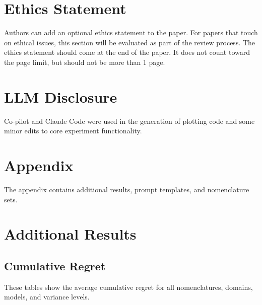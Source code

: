 \documentclass{article} %
\begin{document}
\section*{Ethics Statement}
Authors can add an optional ethics statement to the paper. 
For papers that touch on ethical issues, this section will be evaluated as part of the review process. The ethics statement should come at the end of the paper. It does not count toward the page limit, but should not be more than 1 page. 

\section*{LLM Disclosure}
Co-pilot and Claude Code were used in the generation of plotting code and some minor edits to core experiment functionality. 




\appendix
\section{Appendix}
The appendix contains additional results, prompt templates, and nomenclature sets.

\section{Additional Results}
\label{app:results}

\subsection{Cumulative Regret}
These tables show the average cumulative regret for all nomenclatures, domains, models, and variance levels.









\end{document}
